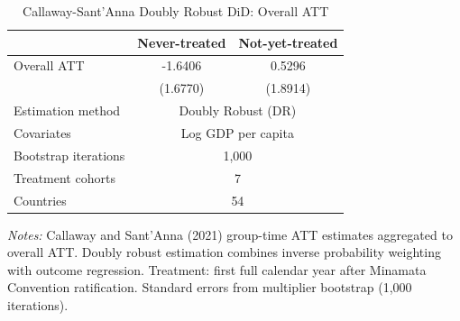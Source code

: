 \begin{table}[htbp]
\centering
\caption{Callaway-Sant'Anna Doubly Robust DiD: Overall ATT}
\label{tab:cs_att}
\begin{tabular}{lcc}
\hline\hline
 & Never-treated & Not-yet-treated \\
\hline
Overall ATT & -1.6406 & 0.5296 \\
 & (1.6770) & (1.8914) \\
\hline
Estimation method & \multicolumn{2}{c}{Doubly Robust (DR)} \\
Covariates & \multicolumn{2}{c}{Log GDP per capita} \\
Bootstrap iterations & \multicolumn{2}{c}{1,000} \\
Treatment cohorts & \multicolumn{2}{c}{7} \\
Countries & \multicolumn{2}{c}{54} \\
\hline\hline
\end{tabular}
\begin{tablenotes}[flushleft]\small
\item \textit{Notes:} Callaway and Sant'Anna (2021) group-time ATT estimates aggregated to overall ATT. Doubly robust estimation combines inverse probability weighting with outcome regression. Treatment: first full calendar year after Minamata Convention ratification. Standard errors from multiplier bootstrap (1,000 iterations).
\end{tablenotes}
\end{table}
